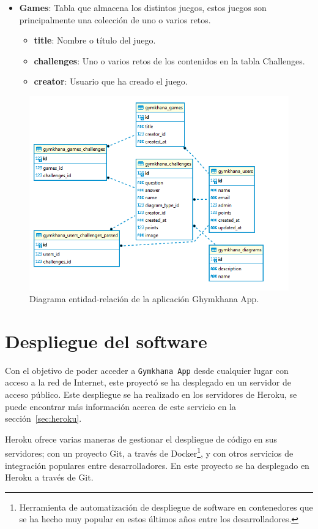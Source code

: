 \documentclass[a4paper, 12pt]{book}
\begin{document}
\begin{itemize}
	\item \textbf {Games}: Tabla que almacena los distintos juegos, estos juegos son principalmente una colección de uno o varios retos. 
	\begin{itemize}
		\item \textbf {title}: Nombre o título del juego. 
		\item \textbf {challenges}: Uno o varios retos de los contenidos en la tabla Challenges. 
		\item \textbf {creator}: Usuario que ha creado el juego. 
	\end{itemize}
	
\end{itemize}

\begin{figure}
	\centering
	\includegraphics[width=16cm, keepaspectratio]{img/gymkhana_ER.png}
	\caption{Diagrama entidad-relación de la aplicación Ghymkhana App.}\label{fig:diagarma_ER}
\end{figure}

\section{Despliegue del software}
\label{sec:despliegue}
Con el objetivo de poder acceder a \texttt{Gymkhana App} desde cualquier lugar con acceso a la red de Internet, este proyectó se ha desplegado en un servidor de acceso público. Este despliegue se ha realizado en los servidores de Heroku, se puede encontrar más información acerca de este servicio en la sección~\ref{sec:heroku}. 

Heroku ofrece varias maneras de gestionar el despliegue de código en sus servidores; con un proyecto Git, a través de Docker\footnote{Herramienta de automatización de despliegue de software en contenedores que se ha hecho muy popular en estos últimos años entre los desarrolladores.}, y con otros servicios de integración populares entre desarrolladores. En este proyecto se ha desplegado en Heroku a través de Git.
\end{document}
